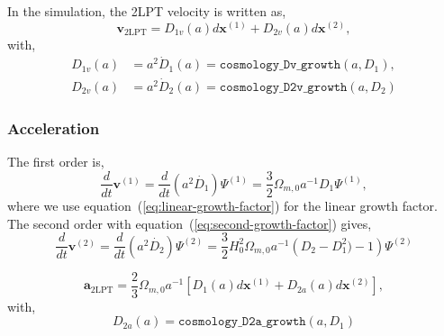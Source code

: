 \documentclass[a4paper]{article}
\begin{document}
\noindent In the simulation, the 2LPT velocity is written as,
\begin{equation}
  \bm{v}_\mathrm{2LPT} = D_{1v}(a) d\bm{x}^{(1)} + D_{2v}(a) d\bm{x}^{(2)},
\end{equation}
with,
\begin{align}
  D_{1v}(a) &= a^2 \dot{D}_1(a) = \texttt{cosmology\_Dv\_growth}(a, D_1),\\
  D_{2v}(a) &= a^2 \dot{D}_2(a) = \texttt{cosmology\_D2v\_growth}(a, D_2)
\end{align}

\subsubsection{Acceleration}
The first order is,
\begin{equation}
  \frac{d}{dt}\bm{v}^{(1)} = \frac{d}{dt} (a^2 \dot{D_1}) \Psi^{(1)}
  = \frac{3}{2} \Omega_{m,0} a^{-1} D_1 \Psi^{(1)},
\end{equation}
where we use equation~(\ref{eq:linear-growth-factor}) for the linear growth factor. The second order with equation~(\ref{eq:second-growth-factor}) gives,
\begin{equation}
  \frac{d}{dt}\bm{v}^{(2)} = \frac{d}{dt} (a^2 \dot{D_2}) \Psi^{(2)}
  = \frac{3}{2} H_0^2 \Omega_{m,0} a^{-1}
    \left(D_2 - D_1^2) - 1\right) \Psi^{(2)}
\end{equation}

\begin{equation}
  \bm{a}_\mathrm{2LPT} = \frac{2}{3} \Omega_{m,0} a^{-1} \left[ D_{1}(a) d\bm{x}^{(1)} + D_{2a}(a) d\bm{x}^{(2)} \right],
\end{equation}
with,
\begin{equation}
  D_{2a}(a) = \texttt{cosmology\_D2a\_growth}(a, D_1)
\end{equation}

\printindex
\end{document}
